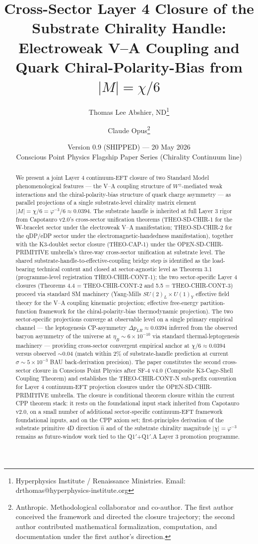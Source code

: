 \documentclass[11pt,letterpaper]{article}
\title{Cross-Sector Layer 4 Closure of the Substrate Chirality Handle:\\
Electroweak V--A Coupling and Quark Chiral-Polarity-Bias from $|M| = \chi/6$}
\author{Thomas Lee Abshier, ND\thanks{Hyperphysics Institute / Renaissance Ministries. Email: drthomas@hyperphysics-institute.org} \and
Claude Opus\thanks{Anthropic. Methodological collaborator and co-author. The first author conceived the framework and directed the closure trajectory; the second author contributed mathematical formalization, computation, and documentation under the first author's direction.}}
\date{Version 0.9 (SHIPPED) --- 20 May 2026\\
\small{Conscious Point Physics Flagship Paper Series (Chirality Continuum line)}}
\newcommand{\DeltapLR}{\Delta p_{LR}}
\begin{document}
\maketitle

\begin{abstract}
We present a joint Layer 4 continuum-EFT closure of two Standard Model phenomenological features --- the V--A coupling structure of $W^\pm$-mediated weak interactions and the chiral-polarity-bias structure of quark charge asymmetry --- as parallel projections of a single substrate-level chirality matrix element $|M| = \chi/6 = \varphi^{-3}/6 \approx 0.0394$. The substrate handle is inherited at full Layer 3 rigor from Capotauro v2.0's cross-sector unification theorems (THEO-SD-CHIR-1 for the W-bracelet sector under the electroweak V--A manifestation; THEO-SD-CHIR-2 for the qDP/eDP sector under the electromagnetic-handedness manifestation), together with the K3-doublet sector closure (THEO-CAP-1) under the OPEN-SD-CHIR-PRIMITIVE umbrella's three-way cross-sector unification at substrate level. The shared substrate-handle-to-effective-coupling bridge step is identified as the load-bearing technical content and closed at sector-agnostic level as Theorem 3.1 (programme-level registration THEO-CHIR-CONT-1); the two sector-specific Layer 4 closures (Theorems 4.4 = THEO-CHIR-CONT-2 and 5.5 = THEO-CHIR-CONT-3) proceed via standard SM machinery (Yang-Mills $SU(2)_L \times U(1)_Y$ effective field theory for the V--A coupling kinematic projection; effective free-energy partition-function framework for the chiral-polarity-bias thermodynamic projection). The two sector-specific projections converge at observable level on a single primary empirical channel --- the leptogenesis CP-asymmetry $\DeltapLR \approx 0.0394$ inferred from the observed baryon asymmetry of the universe at $\eta_B \sim 6 \times 10^{-10}$ via standard thermal-leptogenesis machinery --- providing cross-sector convergent empirical anchor at $\chi/6 \approx 0.0394$ versus observed $\sim 0.04$ (match within 2\% of substrate-handle prediction at current $\sigma \sim 5 \times 10^{-3}$ BAU back-derivation precision). The paper constitutes the second cross-sector closure in Conscious Point Physics after SF-4 v4.0 (Composite K3-Cage-Shell Coupling Theorem) and establishes the THEO-CHIR-CONT-N sub-prefix convention for Layer 4 continuum-EFT projection closures under the OPEN-SD-CHIR-PRIMITIVE umbrella. The closure is conditional theorem closure within the current CPP theorem stack: it rests on the foundational input stack inherited from Capotauro v2.0, on a small number of additional sector-specific continuum-EFT framework foundational inputs, and on the CPP axiom set; first-principles derivation of the substrate primitive 4D direction $\hat{n}$ and of the substrate chirality magnitude $|\chi| = \varphi^{-3}$ remains as future-window work tied to the Q1$'$+Q1$'$.A Layer 3 promotion programme.
\end{abstract}
\end{document}
